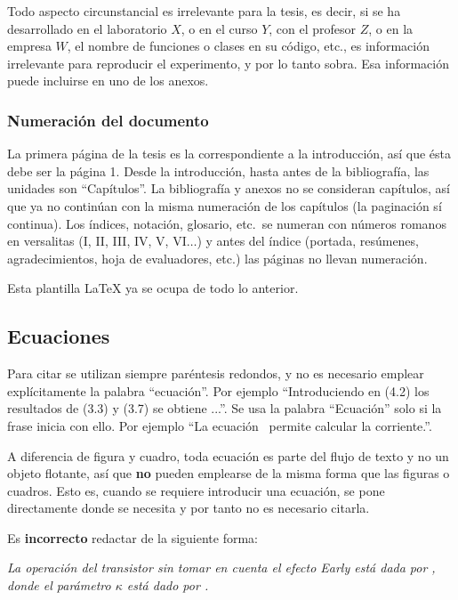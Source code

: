Todo aspecto circunstancial es irrelevante para la tesis, es decir, si se ha
desarrollado en el laboratorio $X$, o en el curso $Y$, con el profesor $Z$, o
en la empresa $W$, el nombre de funciones o clases en su código, etc., es
información irrelevante para reproducir el experimento, y por lo tanto sobra.
%
Esa información puede incluirse en uno de los anexos.


\subsubsection{Numeración del documento}

La primera página de la tesis es la correspondiente a la introducción,
así que ésta debe ser la página 1. Desde la introducción, hasta antes
de la bibliografía, las unidades son ``Capítulos''. La bibliografía y
anexos no se consideran capítulos, así que ya no continúan con la
misma numeración de los capítulos (la paginación sí continua). Los
índices, notación, glosario, etc.\ se numeran con números romanos en
versalitas ({\textsc{I}, \textsc{II}, \textsc{III}, \textsc{IV},
  \textsc{V}, \textsc{VI}}$\ldots$) y antes del índice (portada,
resúmenes, agradecimientos, hoja de evaluadores, etc.) las páginas no
llevan numeración.

Esta plantilla LaTeX ya se ocupa de todo lo anterior.

\subsection{Ecuaciones}

Para citar  se utilizan siempre paréntesis redondos, y
no es necesario emplear explícitamente la palabra ``ecuación''. Por
ejemplo ``Introduciendo en (4.2) los resultados de (3.3) y (3.7) se
obtiene ...''.  Se usa la palabra ``Ecuación'' solo si la frase inicia
con ello.  Por ejemplo ``La ecuación~ permite calcular la
corriente.''.

A diferencia de figura y cuadro, toda ecuación es parte del flujo de
texto y no un objeto flotante, así que \textbf{no} pueden emplearse de
la misma forma que las figuras o cuadros.  Esto es, cuando se requiere
introducir una ecuación, se pone directamente donde se necesita y por
tanto no es necesario citarla.

Es \textbf{incorrecto} redactar de la siguiente forma: 

\textsl{La operación del transistor sin tomar en cuenta el efecto Early está
  dada por , donde el parámetro $\kappa$ está dado por
  .}

